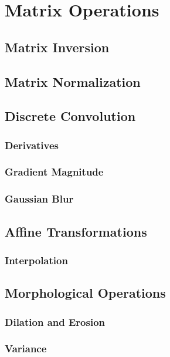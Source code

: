 \documentclass[10pt]{article}
\begin{document}
\clearpage
\section{Matrix Operations}
\baselineskip12pt
\subsection{Matrix Inversion}
\baselineskip14pt
\baselineskip12pt
\subsection{Matrix Normalization}
\baselineskip14pt
\baselineskip12pt
\subsection{Discrete Convolution}
\baselineskip14pt
\baselineskip12pt
\subsubsection{Derivatives}
\baselineskip14pt
\baselineskip12pt
\subsubsection{Gradient Magnitude}
\baselineskip14pt
\baselineskip12pt
\subsubsection{Gaussian Blur}
\baselineskip14pt
\baselineskip12pt
\subsection{Affine Transformations}
\baselineskip14pt
\baselineskip12pt
\subsubsection{Interpolation}
\baselineskip14pt
\baselineskip12pt
\subsection{Morphological Operations}
\baselineskip14pt
\baselineskip12pt
\subsubsection{Dilation and Erosion}
\baselineskip14pt
\baselineskip12pt
\subsubsection{Variance}
\baselineskip14pt
\baselineskip12pt
\end{document}
